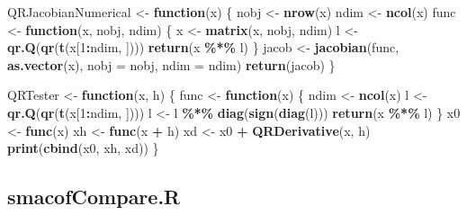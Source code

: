 \documentclass[
  12pt,
]{article}
\newenvironment{Shaded}{\begin{snugshade}}{\end{snugshade}}
\newcommand{\AttributeTok}[1]{\textcolor[rgb]{0.13,0.29,0.53}{#1}}
\newcommand{\ControlFlowTok}[1]{\textcolor[rgb]{0.13,0.29,0.53}{\textbf{#1}}}
\newcommand{\DecValTok}[1]{\textcolor[rgb]{0.00,0.00,0.81}{#1}}
\newcommand{\FunctionTok}[1]{\textcolor[rgb]{0.13,0.29,0.53}{\textbf{#1}}}
\newcommand{\NormalTok}[1]{#1}
\newcommand{\OtherTok}[1]{\textcolor[rgb]{0.56,0.35,0.01}{#1}}
\newcommand{\SpecialCharTok}[1]{\textcolor[rgb]{0.81,0.36,0.00}{\textbf{#1}}}
\begin{document}
\begin{Shaded}
\begin{Highlighting}[]
\NormalTok{QRJacobianNumerical }\OtherTok{\textless{}{-}} \ControlFlowTok{function}\NormalTok{(x) \{}
\NormalTok{  nobj }\OtherTok{\textless{}{-}} \FunctionTok{nrow}\NormalTok{(x)}
\NormalTok{  ndim }\OtherTok{\textless{}{-}} \FunctionTok{ncol}\NormalTok{(x)}
\NormalTok{  func }\OtherTok{\textless{}{-}} \ControlFlowTok{function}\NormalTok{(x, nobj, ndim) \{}
\NormalTok{    x }\OtherTok{\textless{}{-}} \FunctionTok{matrix}\NormalTok{(x, nobj, ndim)}
\NormalTok{    l }\OtherTok{\textless{}{-}} \FunctionTok{qr.Q}\NormalTok{(}\FunctionTok{qr}\NormalTok{(}\FunctionTok{t}\NormalTok{(x[}\DecValTok{1}\SpecialCharTok{:}\NormalTok{ndim, ])))}
    \FunctionTok{return}\NormalTok{(x }\SpecialCharTok{\%*\%}\NormalTok{ l)}
\NormalTok{  \}}
\NormalTok{  jacob }\OtherTok{\textless{}{-}} \FunctionTok{jacobian}\NormalTok{(func, }\FunctionTok{as.vector}\NormalTok{(x), }\AttributeTok{nobj =}\NormalTok{ nobj, }\AttributeTok{ndim =}\NormalTok{ ndim)}
  \FunctionTok{return}\NormalTok{(jacob)}
\NormalTok{\}}

\NormalTok{QRTester }\OtherTok{\textless{}{-}} \ControlFlowTok{function}\NormalTok{(x, h) \{}
\NormalTok{  func }\OtherTok{\textless{}{-}} \ControlFlowTok{function}\NormalTok{(x) \{}
\NormalTok{    ndim }\OtherTok{\textless{}{-}} \FunctionTok{ncol}\NormalTok{(x)}
\NormalTok{    l }\OtherTok{\textless{}{-}} \FunctionTok{qr.Q}\NormalTok{(}\FunctionTok{qr}\NormalTok{(}\FunctionTok{t}\NormalTok{(x[}\DecValTok{1}\SpecialCharTok{:}\NormalTok{ndim, ])))}
\NormalTok{    l }\OtherTok{\textless{}{-}}\NormalTok{ l }\SpecialCharTok{\%*\%} \FunctionTok{diag}\NormalTok{(}\FunctionTok{sign}\NormalTok{(}\FunctionTok{diag}\NormalTok{(l)))}
    \FunctionTok{return}\NormalTok{(x }\SpecialCharTok{\%*\%}\NormalTok{ l)}
\NormalTok{  \}}
\NormalTok{  x0 }\OtherTok{\textless{}{-}} \FunctionTok{func}\NormalTok{(x)}
\NormalTok{  xh }\OtherTok{\textless{}{-}} \FunctionTok{func}\NormalTok{(x }\SpecialCharTok{+}\NormalTok{ h)}
\NormalTok{  xd }\OtherTok{\textless{}{-}}\NormalTok{ x0 }\SpecialCharTok{+} \FunctionTok{QRDerivative}\NormalTok{(x, h)}
  \FunctionTok{print}\NormalTok{(}\FunctionTok{cbind}\NormalTok{(x0, xh, xd))}
\NormalTok{\}}
\end{Highlighting}
\end{Shaded}

\subsection{smacofCompare.R}\label{smacofcompare.r}
\end{document}
